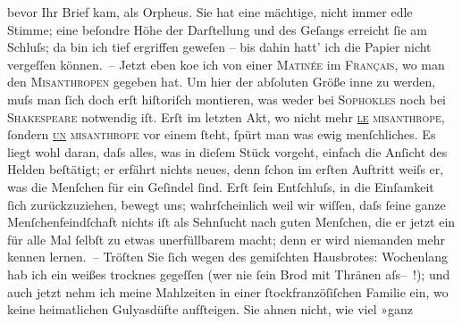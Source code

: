 \begin{ledgroupsized}[t]{13cm}
               bevor Ihr Brief kam, als Orpheus.
               Sie hat eine {\pb}mächtige, nicht immer edle Stimme; eine
               beſondre Höhe der Darſtellung und des Geſangs erreicht ſie am Schluſs; da bin ich
               tief ergriffen geweſen – bis dahin hatt’ ich die Papier nicht vergeſſen können. –\pend
           \pstart
           Jetzt eben ko{\geminationm}e ich von einer \textsc{Matinée} im \textsc{Français}, wo man den \textsc{Misanthropen} gegeben hat. Um hier der abſoluten Größe inne zu werden, muſs man ſich doch
               erſt hiſtoriſch montieren, was weder bei \textsc{Sophokles} noch bei \textsc{Shakespeare} notwendig iſt. Erſt im letzten Akt, {\pb}wo nicht mehr
                  \textsc{\uline{le} misanthrope}, ſondern \textsc{\uline{un} misanthrope} vor einem ſteht, ſpürt man was
               ewig menſchliches. Es liegt wohl daran, daſs alles, was in dieſem Stück vorgeht, einfach die Anſicht des Helden
               beſtätigt; er erfährt nichts neues, denn ſchon im erſten Auftritt weiſs er, was die
               Menſchen für ein Geſindel ſind. Erſt ſein Entſchluſs, in die Einſamkeit ſich
               zurückzuziehen, bewegt uns; wahrſcheinlich weil wir wiſſen, daſs ſeine ganze
               Menſchenfeindſchaft nichts {\pb}iſt als Sehnſucht nach guten
               Menſchen, die er jetzt ein für alle Mal ſelbſt zu etwas unerfüllbarem macht; denn er
               wird niemanden mehr kennen lernen. –\pend
           \pstart
           Tröſten Sie ſich wegen des gemiſchten Hausbrotes: Wochenlang hab ich ein weißes
               trocknes gegeſſen (wer nie ſein Brod mit Thränen
                  aſs– !); und auch jetzt nehm ich meine Mahlzeiten in einer ſtockfranzöſiſchen Familie ein, wo keine heimatlichen {\pb}Gulyasdüfte aufſteigen. Sie ahnen nicht, wie viel »ganz

\end{ledgroupsized}

